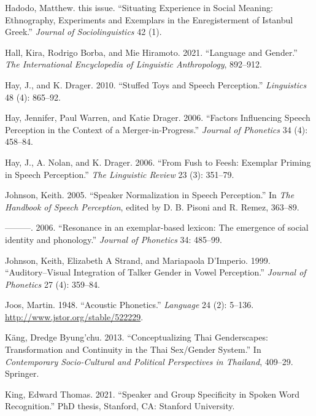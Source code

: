 \documentclass[
  letterpaper,
  DIV=11,
  numbers=noendperiod]{scrartcl}
\newlength{\cslhangindent}
\newenvironment{CSLReferences}[2] %
 {\begin{list}{}{%
  \setlength{\itemindent}{0pt}
  \setlength{\leftmargin}{0pt}
  \setlength{\parsep}{0pt}
  \ifodd #1
   \setlength{\leftmargin}{\cslhangindent}
   \setlength{\itemindent}{-1\cslhangindent}
  \fi
  \setlength{\itemsep}{#2\baselineskip}}}
 {\end{list}}
\begin{document}
\begin{CSLReferences}{1}{0}
Hadodo, Matthew. this issue. {``Situating Experience in Social Meaning:
Ethnography, Experiments and Exemplars in the Enregisterment of Istanbul
Greek.''} \emph{Journal of Sociolinguistics} 42 (1).

Hall, Kira, Rodrigo Borba, and Mie Hiramoto. 2021. {``Language and
Gender.''} \emph{The International Encyclopedia of Linguistic
Anthropology}, 892--912.

Hay, J., and K. Drager. 2010. {``Stuffed Toys and Speech Perception.''}
\emph{Linguistics} 48 (4): 865--92.

Hay, Jennifer, Paul Warren, and Katie Drager. 2006. {``Factors
Influencing Speech Perception in the Context of a Merger-in-Progress.''}
\emph{Journal of Phonetics} 34 (4): 458--84.

Hay, J., A. Nolan, and K. Drager. 2006. {``From Fush to Feesh: Exemplar
Priming in Speech Perception.''} \emph{The Linguistic Review} 23 (3):
351--79.

Johnson, Keith. 2005. {``Speaker Normalization in Speech Perception.''}
In \emph{The Handbook of Speech Perception}, edited by D. B. Pisoni and
R. Remez, 363--89.

---------. 2006. {``{Resonance in an exemplar-based lexicon: The
emergence of social identity and phonology.}''} \emph{Journal of
Phonetics} 34: 485--99.

Johnson, Keith, Elizabeth A Strand, and Mariapaola D'Imperio. 1999.
{``Auditory--Visual Integration of Talker Gender in Vowel Perception.''}
\emph{Journal of Phonetics} 27 (4): 359--84.

Joos, Martin. 1948. {``Acoustic Phonetics.''} \emph{Language} 24 (2):
5--136. \url{http://www.jstor.org/stable/522229}.

Käng, Dredge Byung'chu. 2013. {``Conceptualizing Thai Genderscapes:
Transformation and Continuity in the Thai Sex/Gender System.''} In
\emph{Contemporary Socio-Cultural and Political Perspectives in
Thailand}, 409--29. Springer.

King, Edward Thomas. 2021. {``Speaker and Group Specificity in Spoken
Word Recognition.''} PhD thesis, Stanford, CA: Stanford University.


\end{CSLReferences}
\end{document}
